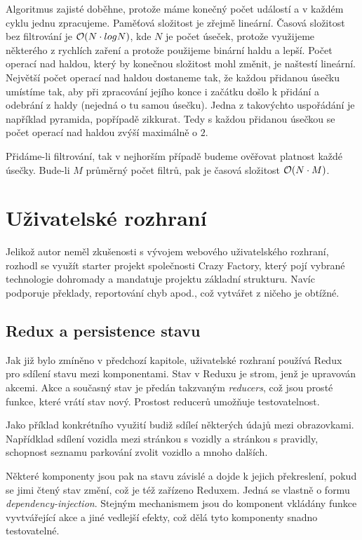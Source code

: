 Algoritmus zajisté doběhne, protože máme konečný počet událostí a v každém cyklu jednu zpracujeme.
Paměťová složitost je zřejmě lineární. Časová složitost bez filtrování je ${\cal O}(N\cdot{logN})$, kde $N$ je 
počet úseček, protože
využijeme některého z rychlích zaření a protože použijeme binární haldu a lepší. Počet operací nad haldou,
který by konečnou složitost mohl změnit, je naštestí lineární. Největší počet operací nad haldou dostaneme tak, že
každou přidanou úsečku umístíme tak, aby při zpracování jejího konce i začátku došlo k přidání a odebrání z haldy
(nejedná o tu samou úsečku). Jedna z takovýchto uspořádání je například pyramida, popřípadě zikkurat.
Tedy s každou přidanou úsečkou se počet operací nad haldou zvýší maximálně o $2$.

Přidáme-li filtrování, tak v nejhorším případě budeme ověřovat platnost každé úsečky. Bude-li $M$ průměrný počet
filtrů, pak je časová složitost ${\cal O}(N\cdot{M})$. 

\section{Uživatelské rozhraní}

Jelikož autor neměl zkušenosti s vývojem webového uživatelského rozhraní, rozhodl se využít starter projekt
společnosti Crazy Factory, který pojí vybrané technologie dohromady a mandatuje projektu základní strukturu.
Navíc podporuje překlady, reportování chyb apod., což vytvářet z ničeho je obtížné. \citep[viz][]{CFProj}

\subsection{Redux a persistence stavu}

Jak již bylo zmíněno v předchozí kapitole, uživatelské rozhraní používá Redux pro sdílení stavu mezi komponentami.
Stav v Reduxu je strom, jenž je upravován akcemi. Akce a současný stav je předán takzvaným \textit{reducers}, což jsou prosté funkce,
které vrátí stav nový. \citep[viz][]{ReduxCore} Prostost reducerů umožňuje testovatelnost.

Jako příklad konkrétního využití budiž sdíleí některých údajů mezi obrazovkami.
Napřídklad sdílení vozidla mezi stránkou s vozidly a stránkou s pravidly, schopnost seznamu parkování zvolit vozidlo a mnoho dalších.

Některé komponenty jsou pak na stavu závislé a dojde k jejich překreslení, pokud se jimi čtený stav změní, což je též zařízeno
Reduxem. Jedná se vlastně o formu \textit{dependency-injection}. Stejným mechanismem jsou do komponent vkládány
funkce vyvtvářející akce a jiné vedlejší efekty, což dělá tyto komponenty snadno testovatelné.

